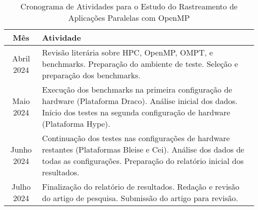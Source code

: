 \documentclass[ppgc,diss]{iiufrgs}
\begin{document}
\begin{table}[h]
	\caption{Cronograma de Atividades para o Estudo do Rastreamento de Aplicações Paralelas com OpenMP}
	\begin{center}
		\begin{tabular}{c|p{10cm}}
			\textbf{Mês} & \textbf{Atividade} \\
			\hline
			\hline
			Abril 2024 & Revisão literária sobre HPC, OpenMP, OMPT, e benchmarks. Preparação do ambiente de teste. Seleção e preparação dos benchmarks. \\
			\hline
			Maio 2024 & Execução dos benchmarks na primeira configuração de hardware (Plataforma Draco). Análise inicial dos dados. Início dos testes na segunda configuração de hardware (Plataforma Hype). \\
			\hline
			Junho 2024 & Continuação dos testes nas configurações de hardware restantes (Plataformas Bleise e Cei). Análise dos dados de todas as configurações. Preparação do relatório inicial dos resultados. \\
			\hline
			Julho 2024 & Finalização do relatório de resultados. Redação e revisão do artigo de pesquisa. Submissão do artigo para revisão. \\
			\hline
		\end{tabular}
	\end{center}
	\label{tbl:cronograma}
\end{table}






\end{document}
